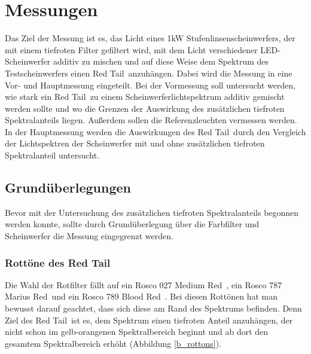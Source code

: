 \chapter{Messungen}
Das Ziel der Messung ist es, das Licht eines 1kW Stufenlinsenscheinwerfers, der mit einem tiefroten Filter gefiltert wird, mit dem Licht verschiedener LED-Scheinwerfer additiv zu mischen und auf diese Weise dem Spektrum des Testscheinwerfers einen \glqq Red Tail\grqq\ anzuhängen. Dabei wird die Messung in eine Vor- und Hauptmessung eingeteilt. Bei der Vormessung soll untersucht werden, wie stark ein \glqq Red Tail\grqq\ zu einem Scheinwerferlichtspektrum additiv gemischt werden sollte und wo die Grenzen der Auswirkung des zusätzlichen tiefroten Spektralanteils liegen. Außerdem sollen die Referenzleuchten vermessen werden.\\
In der Hauptmessung werden die Auswirkungen des \glqq Red Tail\grqq\ durch den Vergleich der Lichtspektren der Scheinwerfer mit und ohne zusätzlichen tiefroten Spektralanteil untersucht.

\section{Grundüberlegungen}\label{sec_mgrund}
Bevor mit der Untersuchung des zusätzlichen tiefroten Spektralanteils begonnen werden konnte, sollte durch Grundüberlegung über die Farbfilter und Scheinwerfer die Messung eingegrenzt werden. 
\subsection{Rottöne des \glqq Red Tail\grqq}
Die Wahl der Rotfilter fällt auf ein Rosco 027 \glqq Medium Red\grqq\ , ein Rosco 787 \glqq Marius Red\grqq\ und ein Rosco 789 \glqq Blood Red\grqq\ . Bei diesen Rottönen hat man bewusst darauf geachtet, dass sich diese am Rand des Spektrums befinden. Denn Ziel des \glqq Red Tail\grqq\ ist es, dem Spektrum einen tiefroten Anteil anzuhängen, der nicht schon im gelb-orangenen Spektralbereich beginnt und ab dort den gesamtem Spektralbereich erhöht (Abbildung \ref{b_rottons}).


